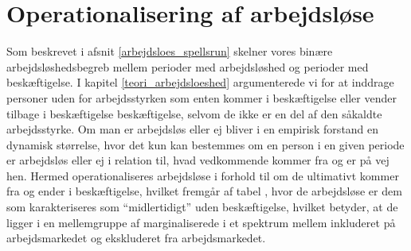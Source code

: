 

\section{Operationalisering af arbejdsløse \label{arbejdsloes_operationalisering}} 

Som beskrevet i afsnit \ref{arbejdsloes_spellsrun} skelner vores binære arbejdsløshedsbegreb mellem perioder med arbejdsløshed og perioder med beskæftigelse. I kapitel \ref{teori_arbejdsloeshed} argumenterede vi for at inddrage personer uden for arbejdsstyrken som enten kommer i beskæftigelse eller vender tilbage i beskæftigelse beskæftigelse, selvom de ikke er en del af den såkaldte arbejdsstyrke. Om man er arbejdsløs eller ej bliver i en empirisk forstand en dynamisk størrelse, hvor det kun kan bestemmes om en person i en given periode er arbejdsløs eller ej i relation til, hvad vedkommende kommer fra og er på vej hen. Hermed operationaliseres arbejdsløse i forhold til om de ultimativt kommer fra og ender i beskæftigelse, hvilket fremgår af tabel \label{tab_marginaliseringsmodel_3}, hvor de arbejdsløse er dem som karakteriseres som “midlertidigt” uden beskæftigelse, hvilket betyder, at de ligger i en mellemgruppe af marginaliserede i et spektrum mellem inkluderet på arbejdsmarkedet og ekskluderet fra arbejdsmarkedet.

